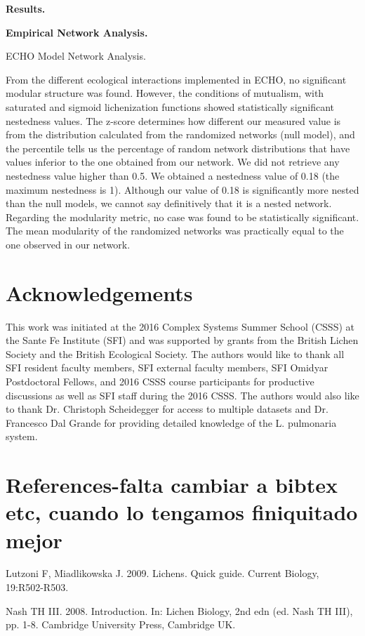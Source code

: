 \documentclass[runningheads,a4paper]{llncs}
\begin{document}
\textbf{Results.} 

\textbf{Empirical Network Analysis. }

ECHO Model Network Analysis. 

From the different ecological interactions implemented in ECHO, no significant modular structure was found. However, the conditions of mutualism, with saturated and sigmoid lichenization functions showed statistically significant nestedness values. The z-score determines how different our measured value is from the distribution calculated from the randomized networks (null model), and the percentile tells us the percentage of random network distributions that have values inferior to the one obtained from our network. We did not retrieve any nestedness value higher than 0.5. We obtained a nestedness value of 0.18 (the maximum nestedness is 1). Although our value of 0.18 is significantly more nested than the null models, we cannot say definitively that it is a nested network. Regarding the modularity metric, no case was found to be statistically significant. The mean modularity of the randomized networks was practically equal to the one observed in our network. 

\section*{Acknowledgements}
This work was initiated at the 2016 Complex Systems Summer School (CSSS) at the Sante Fe Institute (SFI) and was supported by grants from the British Lichen Society and the British Ecological Society. The authors would like to thank all SFI resident faculty members, SFI external faculty members, SFI Omidyar Postdoctoral Fellows, and 2016 CSSS course participants for productive discussions as well as SFI staff during the 2016 CSSS. The authors would also like to thank Dr. Christoph Scheidegger for access to multiple datasets and Dr. Francesco Dal Grande for providing detailed knowledge of the L. pulmonaria system. 

\section*{References-falta cambiar a bibtex etc, cuando lo tengamos finiquitado mejor}
Lutzoni F,  Miadlikowska J. 2009. Lichens. Quick guide. Current Biology, 19:R502-R503.

Nash TH III. 2008. Introduction. In: Lichen Biology, 2nd edn (ed. Nash TH III), pp. 1-8. Cambridge University Press, Cambridge UK.
\end{document}
